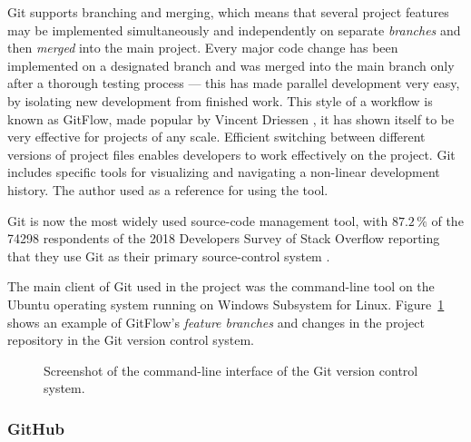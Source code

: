 \documentclass[english,bachelors,forcepolishlogotype]{wizthesis}
\begin{document}
Git supports branching and merging, which means that several project features
may be implemented simultaneously and independently on separate \emph{branches}
and then \emph{merged} into the main project. Every major code change has been
implemented on a designated branch and was merged into the main branch only
after a thorough testing process --- this has made parallel development very
easy, by isolating new development from finished work. This style of a workflow
is known as GitFlow, made popular by Vincent Driessen \cite{git-flow}, it has
shown itself to be very effective for projects of any scale. Efficient switching
between different versions of project files enables developers to work
effectively on the project. Git includes specific tools for visualizing and
navigating a non-linear development history. The author used \cite{chacon-2014}
as a reference for using the tool.

Git is now the most widely used source-code management tool, with $87.2\,\%$ of
the 74298 respondents of the 2018 Developers Survey of Stack Overflow reporting
that they use Git as their primary source-control system
\cite{stack-overflow-insights-2018}.

The main client of Git used in the project was the command-line tool on the
Ubuntu operating system running on Windows Subsystem for Linux.
Figure~\ref{fig:git} shows an example of GitFlow's \emph{feature branches} and
changes in the project repository in the Git version control system.

\begin{figure}[h]
  \centering
  \caption{Screenshot of the command-line interface of the Git version control
  system.}
  \label{fig:git}
\end{figure}

\subsubsection*{GitHub}
\end{document}
